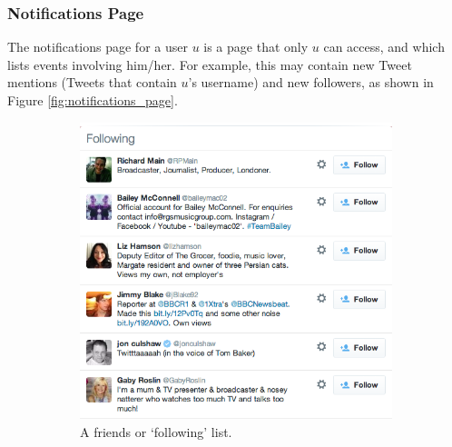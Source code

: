 \subsubsection{Notifications Page}
The notifications page for a user $u$ is a page that only $u$ can access, and which lists events involving him/her. For example, this may contain new Tweet mentions (Tweets that contain $u$'s username) and new followers, as shown in Figure \ref{fig:notifications_page}.

\begin{figure}[h]
    \begin{subfigure}{.5\textwidth}
        \centering
        \includegraphics[scale=0.4]{2.Background/Media/following_list.png} 
        \caption{A friends or `following' list.}
        \label{fig:following_list}
    \end{subfigure}
    \quad
    \begin{subfigure}{.5\textwidth}
         \centering

\end{subfigure}
\end{figure}
